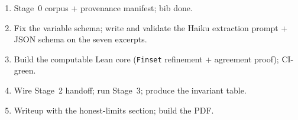 \documentclass[11pt]{article}
\newcommand{\lean}[1]{\texttt{#1}}
\begin{document}
\begin{enumerate}
\item[P0.] Stage~0 corpus + provenance manifest; bib done.
\item[P1.] Fix the variable schema; write and validate the Haiku
  extraction prompt + JSON schema on the seven excerpts.
\item[P2.] Build the computable Lean core (\lean{Finset} refinement +
  agreement proof); CI-green.
\item[P3.] Wire Stage~2 handoff; run Stage~3; produce the invariant table.
\item[P4.] Writeup with the honest-limits section; build the PDF.
\end{enumerate}



\end{document}

